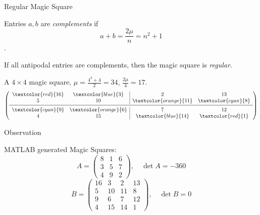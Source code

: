 \documentclass[10pt]{beamer}
\begin{document}
  \begin{frame}{Regular Magic Square}
    \begin{definition}
      Entries $a,b$ are \emph{complements} if $$a+b=\frac{2\mu}{n} = n^2+1$$.
    \end{definition}
    \begin{definition}
      If all antipodal entries are complements, then the magic square is \emph{regular}.
    \end{definition}
  
    \begin{example}
    A $4\times 4$ magic square, $\mu=\frac{4^3+4}{2}=34$, $\frac{2\mu}{4}=17$.
    \[\left(\begin{array}{cc|cc}
      \textcolor{red}{16}&\textcolor{blue}{3}&2&13\\
      5&10&\textcolor{orange}{11}&\textcolor{cyan}{8}\\
      \midrule
      \textcolor{cyan}{9}&\textcolor{orange}{6}&7&12\\
      4&15&\textcolor{blue}{14}&\textcolor{red}{1}
    \end{array}\right)\]
    \end{example}
  \end{frame}

  \begin{frame}{Observation}
    \begin{example}
        MATLAB generated Magic Squares:
        \[A=\begin{pmatrix}
            8&1&6\\
            3&5&7\\
            4&9&2
          \end{pmatrix},\quad \det A=-360\]
          \[B=\begin{pmatrix}
            16&3&2&13\\
            5&10&11&8\\
            9&6&7&12\\
            4&15&14&1
          \end{pmatrix},\quad \det B=0\] 
    \end{example}   
  \end{frame}
\end{document}

